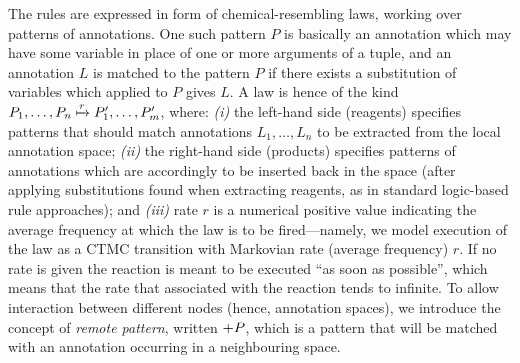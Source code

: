 \documentclass[12pt,a4paper,twoside,openright]{book}
\begin{document}
The rules are expressed in form of chemical-resembling laws, working over patterns of annotations.
%
One such pattern $P$ is basically an annotation which may have some variable in place of one or more arguments of a tuple, and an annotation $L$ is matched to the pattern $P$ if there exists a substitution of variables which applied to $P$ gives $L$.
%
A law is hence of the kind \mbox{$P_1,\ldots,P_n\xmapsto{r}P'_1,\ldots,P'_m$}, where: \emph{(i)} the left-hand side (reagents) specifies patterns that should match annotations $L_1,\ldots,L_n$ to be extracted from the local annotation space; \emph{(ii)} the right-hand side (products) specifies patterns of annotations which are accordingly to be inserted back in the space (after applying substitutions found when extracting reagents, as in standard logic-based rule approaches); and \emph{(iii)} rate $r$ is a numerical positive value indicating the average frequency at which the law is to be fired---namely, we model execution of the law as a CTMC transition with Markovian rate (average frequency) $r$. If no rate is given the reaction is meant to be executed ``as soon as possible'', which means that the rate that associated with the reaction tends to infinite.
%
To allow interaction between different nodes (hence, annotation spaces), we introduce the concept of \emph{remote pattern}, written $+P$, which is a pattern that will be matched with an annotation occurring in a neighbouring space.
\end{document}
